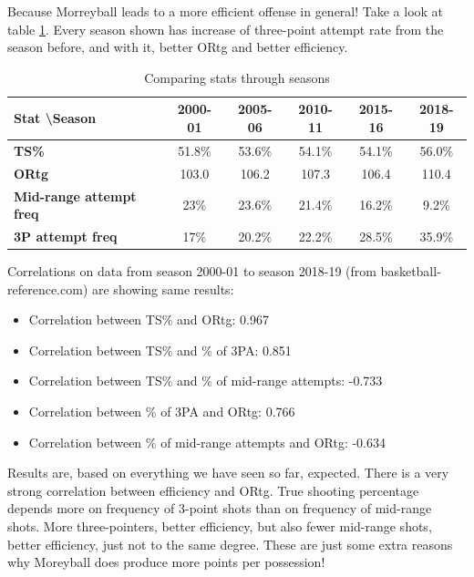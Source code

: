\documentclass[a4paper]{article}
\begin{document}
Because Morreyball leads to a more efficient offense in general! Take a look at table \ref{tab:seasons_comp}. Every season shown has increase of three-point attempt rate from the season before, and with it, better ORtg and better efficiency.

\begin{table}[h!]
\begin{center}
\begin{tabular}{|l|c|c|c|c|c|} \hline
\textbf{Stat \textbackslash Season} & \textbf{2000-01} & \textbf{2005-06} & \textbf{2010-11} & \textbf{2015-16} & \textbf{2018-19} \\ \hline
\textbf{TS\%} & 51.8\% & 53.6\% & 54.1\% & 54.1\% & 56.0\% \\ \hline
\textbf{ORtg} & 103.0 & 106.2 & 107.3 & 106.4 & 110.4 \\ \hline
\textbf{Mid-range attempt freq} & 23\% & 23.6\% & 21.4\% & 16.2\% & 9.2\% \\ \hline
\textbf{3P attempt freq} & 17\% & 20.2\% & 22.2\% & 28.5\% & 35.9\% \\ \hline
\end{tabular}
\caption{Comparing stats through seasons}
\label{tab:seasons_comp}
\end{center}
\end{table}

Correlations on data from season 2000-01 to season 2018-19 (from basketball-reference.com) are showing same results:

\begin{itemize}
	\item Correlation between TS\% and ORtg: 0.967
	\item Correlation between TS\% and \% of 3PA: 0.851
	\item Correlation between TS\% and \% of mid-range attempts: -0.733
	\item Correlation between \% of 3PA and ORtg: 0.766
	\item Correlation between \% of mid-range attempts and ORtg: -0.634
\end{itemize}

Results are, based on everything we have seen so far, expected. There is a very strong correlation between efficiency and ORtg. True shooting percentage depends more on frequency of 3-point shots than on frequency of mid-range shots. More three-pointers, better efficiency, but also fewer mid-range shots, better efficiency, just not to the same degree. These are just some extra reasons why Moreyball does produce more points per possession!
\end{document}
